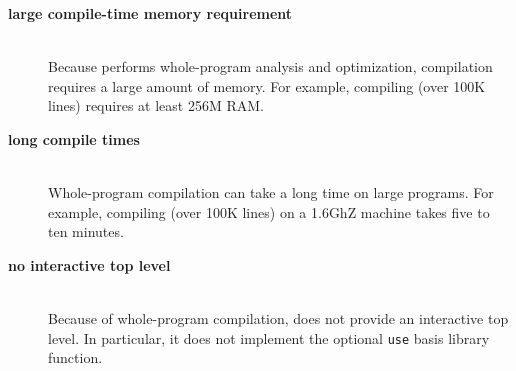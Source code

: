 
\newcommand{\drawback}[1]{\item[\bf #1]\hspace{1in}\\}

\begin{description}

\drawback{large compile-time memory requirement}
Because {\mlton} performs whole-program analysis and optimization,
compilation requires a large amount of memory.  For example, compiling
{\mlton} (over 100K lines) requires at least 256M RAM.

\drawback{long compile times}
Whole-program compilation can take a long time on large programs.  For
example, compiling {\mlton} (over 100K lines) on a 1.6GhZ machine
takes five to ten minutes.

\drawback{no interactive top level}
Because of whole-program compilation, {\mlton} does not provide an
interactive top level.  In particular, it does not implement the
optional {\tt use} basis library function.

\end{description}
